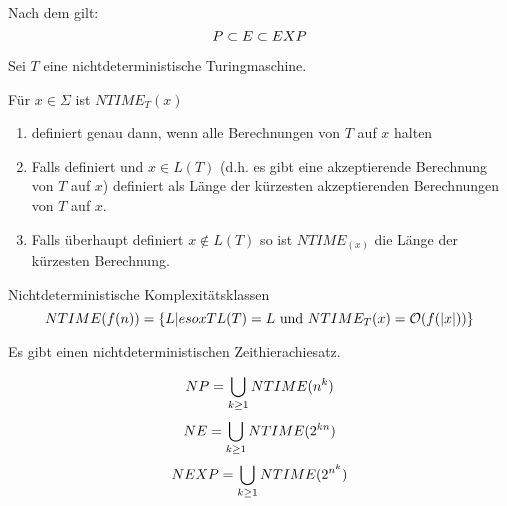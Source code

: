 Nach dem  gilt:
$$ P \subset E \subset EXP $$














\begin{definition}

    Sei $T$ eine nichtdeterministische Turingmaschine. 

    Für $x \in \Sigma$ ist $NTIME_T(x)$
    \begin{enumerate}
        \item definiert genau dann, wenn alle Berechnungen von $T$ auf $x$ halten
        \item Falls definiert und $x \in L(T)$ (d.h. es gibt eine akzeptierende Berechnung von $T$ auf $x$) definiert als Länge der kürzesten akzeptierenden Berechnungen von $T$ auf $x$.
        \item Falls überhaupt definiert $x \notin L(T)$ so ist $NTIME_{(x)}$ die Länge der kürzesten Berechnung.
    \end{enumerate}

\end{definition}


\begin{definition}
    Nichtdeterministische Komplexitätsklassen 
    $$ NTIME(f(n)) = \{ L | esox T L(T)=L \text{ und } NTIME_T(x) = \mathcal{O}(f(|x|)) \} $$

    Es gibt einen nichtdeterministischen Zeithierachiesatz.




    $$ NP   = \bigcup_{k \geq 1} NTIME(n^k) $$
    $$ NE   = \bigcup_{k \geq 1} NTIME(2^{kn}) $$
    $$ NEXP = \bigcup_{k \geq 1} NTIME(2^{n^k}) $$

\end{definition}


